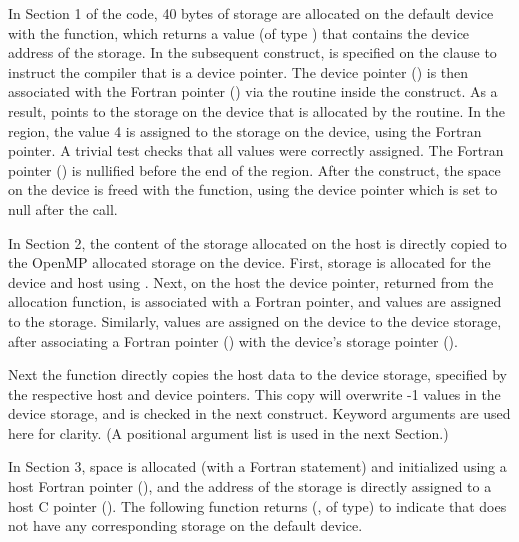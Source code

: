 In Section 1 of the code, 40 bytes of storage are allocated on the default device
with the  function, which returns a value (of type
) that contains the device address of the storage.
In the subsequent  construct,  is specified on the
 clause to instruct the compiler that  is
a device pointer.
The device pointer () is then associated with the Fortran pointer
() via the  routine inside the 
construct.
As a result,  points to the storage on the device that is allocated
by the  routine.
In the  region, the value 4 is assigned to the storage on the device,
using the Fortran pointer.
A trivial test checks that all values were correctly assigned.
The Fortran pointer () is nullified before the end of the  region.
After the  construct, the space on the device is freed with the
 function, using the device  pointer
which is set to null after the call.

In Section 2, the content of the storage allocated on the host is directly copied
to the OpenMP allocated storage on the device.
First, storage is allocated for the device and host using .
Next, on the host the device pointer, returned from the allocation
 function, is associated with a Fortran pointer, and
values are assigned to the storage. Similarly, values are assigned on the device
to the device storage, after associating a Fortran pointer ()
with the device's storage pointer ().

Next the  function directly copies the host data
to the device storage, specified by the respective host and device pointers.
This copy will overwrite -1 values in the device storage, and is checked in the
next  construct.
Keyword arguments are used here for clarity.
(A positional argument list is used in the next Section.)

In Section 3, space is allocated (with a Fortran  statement) and initialized using a
host Fortran pointer (), and the address of the storage is directly assigned to a
host C pointer ().
The following  function returns 
(, of  type) to indicate that 
does not have any corresponding storage on the default device.

